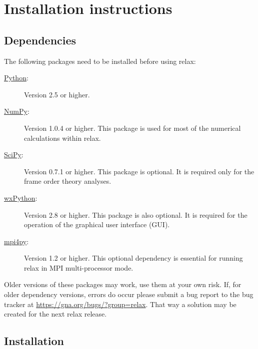 
\chapter{Installation instructions}



\section{Dependencies}

The following packages need to be installed before using relax:

\begin{description}
\item[\href{http://python.org/}{Python}:]  Version 2.5 or higher.
\item[\href{http://numpy.scipy.org/}{NumPy}:]  Version 1.0.4 or higher.  This package is used for most of the numerical calculations within relax.
\item[\href{http://www.scipy.org/}{SciPy}:]  Version 0.7.1 or higher.  This package is optional.  It is required only for the frame order theory analyses.
\item[\href{http://www.scipy.org/}{wxPython}:]  Version 2.8 or higher.  This package is also optional.  It is required for the operation of the graphical user interface (GUI).
\item[\href{http://mpi4py.scipy.org/}{mpi4py}:]  Version 1.2 or higher.  This optional dependency is essential for running relax in MPI multi-processor mode.
\end{description}

Older versions of these packages may work, use them at your own risk.  If, for older dependency versions, errors do occur please submit a bug report to the bug tracker at \href{https://gna.org/bugs/?group=relax}{https://gna.org/bugs/?group=relax}.  That way a solution may be created for the next relax release.




\section{Installation}


